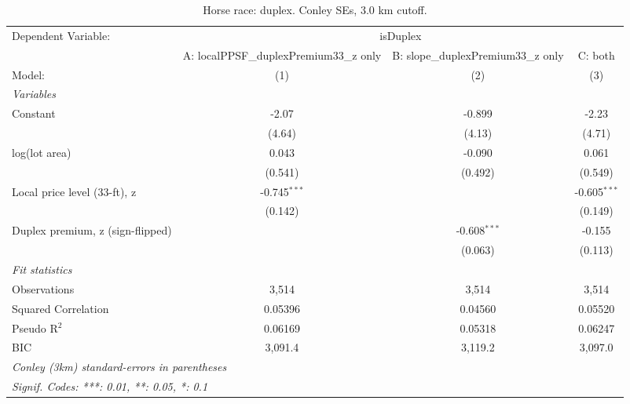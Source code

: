 
\begin{table}[htbp]
   \caption{\label{tab:horseRace_duplex_conley} Horse race: duplex. Conley SEs, 3.0 km cutoff.}
   \centering
   \begin{tabular}{lccc}
      \tabularnewline \midrule \midrule
      Dependent Variable: & \multicolumn{3}{c}{isDuplex}\\
                                       & A: localPPSF\_duplexPremium33\_z only   & B: slope\_duplexPremium33\_z only   & C: both \\   
      Model:                           & (1)                                     & (2)                                 & (3)\\  
      \midrule
      \emph{Variables}\\
      Constant                         & -2.07                                   & -0.899                              & -2.23\\   
                                       & (4.64)                                  & (4.13)                              & (4.71)\\   
      log(lot area)                    & 0.043                                   & -0.090                              & 0.061\\   
                                       & (0.541)                                 & (0.492)                             & (0.549)\\   
      Local price level (33-ft), z     & -0.745$^{***}$                          &                                     & -0.605$^{***}$\\   
                                       & (0.142)                                 &                                     & (0.149)\\   
      Duplex premium, z (sign-flipped) &                                         & -0.608$^{***}$                      & -0.155\\   
                                       &                                         & (0.063)                             & (0.113)\\   
      \midrule
      \emph{Fit statistics}\\
      Observations                     & 3,514                                   & 3,514                               & 3,514\\  
      Squared Correlation              & 0.05396                                 & 0.04560                             & 0.05520\\  
      Pseudo R$^2$                     & 0.06169                                 & 0.05318                             & 0.06247\\  
      BIC                              & 3,091.4                                 & 3,119.2                             & 3,097.0\\  
      \midrule \midrule
      \multicolumn{4}{l}{\emph{Conley (3km) standard-errors in parentheses}}\\
      \multicolumn{4}{l}{\emph{Signif. Codes: ***: 0.01, **: 0.05, *: 0.1}}\\
   \end{tabular}
\end{table}


